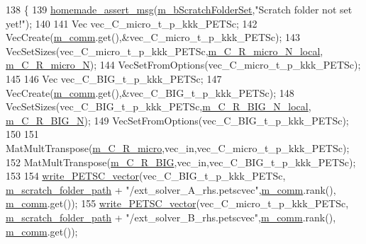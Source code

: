 \begin{DoxyCode}
138 \{
139     \hyperlink{common__header_8h_a593ccc80b790b2268653fcf6597bf451}{homemade\_assert\_msg}(\hyperlink{classcarl_1_1_f_e_t_i___operations_a8bb9de7de35a2f7d7d5982ae1085ba15}{m\_bScratchFolderSet},\textcolor{stringliteral}{"Scratch folder not set
       yet!"});
140 
141     Vec vec\_C\_micro\_t\_p\_kkk\_PETSc;
142     VecCreate(\hyperlink{classcarl_1_1_f_e_t_i___operations_a8cb0ed286667fc9f3ebc2d8ef2a3e13b}{m\_comm}.get(),&vec\_C\_micro\_t\_p\_kkk\_PETSc);
143     VecSetSizes(vec\_C\_micro\_t\_p\_kkk\_PETSc,\hyperlink{classcarl_1_1_f_e_t_i___operations_a6c67394d9e538b1280b7059ff0258577}{m\_C\_R\_micro\_N\_local},
      \hyperlink{classcarl_1_1_f_e_t_i___operations_a067cab6ead10411079ae05a812c35d53}{m\_C\_R\_micro\_N});
144     VecSetFromOptions(vec\_C\_micro\_t\_p\_kkk\_PETSc);
145 
146     Vec vec\_C\_BIG\_t\_p\_kkk\_PETSc;
147     VecCreate(\hyperlink{classcarl_1_1_f_e_t_i___operations_a8cb0ed286667fc9f3ebc2d8ef2a3e13b}{m\_comm}.get(),&vec\_C\_BIG\_t\_p\_kkk\_PETSc);
148     VecSetSizes(vec\_C\_BIG\_t\_p\_kkk\_PETSc,\hyperlink{classcarl_1_1_f_e_t_i___operations_a87856fb17203f71c386d800b1021e483}{m\_C\_R\_BIG\_N\_local},
      \hyperlink{classcarl_1_1_f_e_t_i___operations_a70409f475e309e5fbcea9be931aa321b}{m\_C\_R\_BIG\_N});
149     VecSetFromOptions(vec\_C\_BIG\_t\_p\_kkk\_PETSc);
150 
151     MatMultTranspose(\hyperlink{classcarl_1_1_f_e_t_i___operations_aa2123fe549c1916496e9ea7e656bb7ee}{m\_C\_R\_micro},vec\_in,vec\_C\_micro\_t\_p\_kkk\_PETSc);
152     MatMultTranspose(\hyperlink{classcarl_1_1_f_e_t_i___operations_a397d6a5e3e4111e06bb1ec52abdc6fa8}{m\_C\_R\_BIG},vec\_in,vec\_C\_BIG\_t\_p\_kkk\_PETSc);
153 
154     \hyperlink{namespacecarl_a1632084ec1f296b63559648cc9c2047f}{write\_PETSC\_vector}(vec\_C\_BIG\_t\_p\_kkk\_PETSc,
      \hyperlink{classcarl_1_1_f_e_t_i___operations_ad6d35bc9b5221d45452fbc8931f22055}{m\_scratch\_folder\_path} + \textcolor{stringliteral}{"/ext\_solver\_A\_rhs.petscvec"},\hyperlink{classcarl_1_1_f_e_t_i___operations_a8cb0ed286667fc9f3ebc2d8ef2a3e13b}{m\_comm}.rank(),
      \hyperlink{classcarl_1_1_f_e_t_i___operations_a8cb0ed286667fc9f3ebc2d8ef2a3e13b}{m\_comm}.get());
155     \hyperlink{namespacecarl_a1632084ec1f296b63559648cc9c2047f}{write\_PETSC\_vector}(vec\_C\_micro\_t\_p\_kkk\_PETSc,
      \hyperlink{classcarl_1_1_f_e_t_i___operations_ad6d35bc9b5221d45452fbc8931f22055}{m\_scratch\_folder\_path} + \textcolor{stringliteral}{"/ext\_solver\_B\_rhs.petscvec"},\hyperlink{classcarl_1_1_f_e_t_i___operations_a8cb0ed286667fc9f3ebc2d8ef2a3e13b}{m\_comm}.rank(),
      \hyperlink{classcarl_1_1_f_e_t_i___operations_a8cb0ed286667fc9f3ebc2d8ef2a3e13b}{m\_comm}.get());

\end{DoxyCode}
